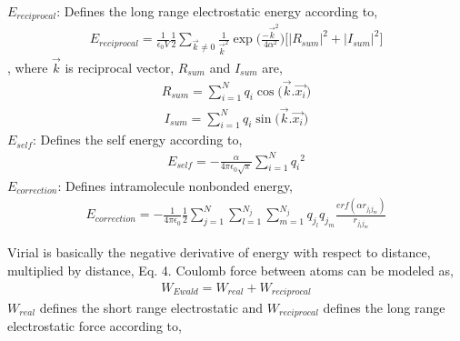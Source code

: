 \documentclass[letterpaper,10pt,english]{sphinxmanual}
\begin{document}
\begin{description}
\(E_{reciprocal}\): Defines the long range electrostatic energy according to,
\begin{equation*}
\begin{split}E_{reciprocal} = \frac{1}{\epsilon_0 V} \frac {1}{2} \sum_{\overrightarrow{k} \ne 0}^{} \frac {1}{\overrightarrow{k}^2}\exp\bigg(\frac {-\overrightarrow{k}^2}{4 \alpha^2}\bigg) \Bigg[ {\Big| R_{sum} \Big|}^2 + {\Big| I_{sum} \Big|}^2 \bigg]\end{split}
\end{equation*}
, where \(\overrightarrow{k}\) is reciprocal vector, \(R_{sum}\) and \(I_{sum}\) are,
\begin{equation*}
\begin{split}R_{sum} = \sum_{i=1}^{N} q_i \cos \big(\overrightarrow{k}.\overrightarrow{x_i}\big)\end{split}
\end{equation*}\begin{equation*}
\begin{split}I_{sum} = \sum_{i=1}^{N} q_i \sin \big(\overrightarrow{k}.\overrightarrow{x_i}\big)\end{split}
\end{equation*}
\(E_{self}\): Defines the self energy according to,
\begin{equation*}
\begin{split}E_{self} = -\frac{\alpha}{4\pi \epsilon_0 \sqrt{\pi}} \sum_{i=1}^{N} {q_i}^2\end{split}
\end{equation*}
\(E_{correction}\): Defines intra\sphinxhyphen{}molecule nonbonded energy,
\begin{equation*}
\begin{split}E_{correction} = -\frac{1}{4\pi \epsilon_0} \frac{1}{2} \sum_{j=1}^{N }\sum_{l =1}^{N_j} \sum_{m = 1}^{N_j} q_{j_l} q_{j_m}  \frac{erf(\alpha r_{j_l j_m})}{r_{j_l j_m}}\end{split}
\end{equation*}
\item[{\sphinxcode{\sphinxupquote{Virial Calculation}}}] \leavevmode
Virial is basically the negative derivative of energy with respect to distance, multiplied by distance, Eq. 4. Coulomb force between atoms can be modeled as,
\begin{equation*}
\begin{split}W_{Ewald} = W_{real} + W_{reciprocal}\end{split}
\end{equation*}
\(W_{real}\) defines the short range electrostatic and \(W_{reciprocal}\) defines the long range electrostatic force according to,

\end{description}
\end{document}
